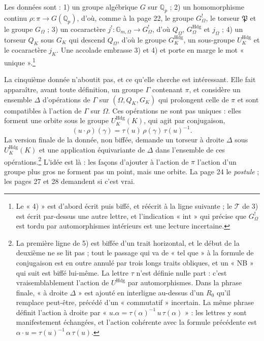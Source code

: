 \documentclass[11pt,a4paper]{article}
\begin{document}
Les données sont : 1) un groupe algébrique $G$ sur $\mathbb{Q}_p$ ; 2) un
homomorphisme continu $\rho : \pi \to G(\mathbb{Q}_p)$, d'où, comme à la
page 22, le groupe $G^{!}_{\Omega}$, le torseur $\mathfrak{P}$ et le groupe
$G_{\Omega}$ ; 3) un cocaractère $j^{!} : \mathbb{G}_{m,\Omega} \to
G^{!}_{\Omega}$, d'où $Q_{\Omega}$, $G^{\mathrm{Hdg}}_{\Omega}$ et
$j_{\Omega}$ ; 4) un torseur $Q_K$ sous $G_K$ qui descend $Q_{\Omega}$, d'où le
groupe $G^{\mathrm{Hdg}}_K$, un sous-groupe $U^{\mathrm{Hdg}}_K$ et le
cocaractère $j_K$. Une accolade embrasse 3) et 4) et porte en marge le mot
« unique ».\footnote{Le « 4) » est d'abord écrit puis biffé, et réécrit à la
ligne suivante ; le $\mathcal{T}$ de 3) est écrit par-dessus une autre
lettre, et l'indication « $\mathrm{int}$ » qui précise que $G^{!}_{\Omega}$ est
tordu par automorphismes intérieurs est une lecture incertaine.}

La cinquième donnée n'aboutit pas, et ce qu'elle cherche est intéressant. Elle
fait apparaître, avant toute définition, un groupe $\Gamma$ contenant $\pi$,
et considère un ensemble $\Delta$ d'opérations de $\Gamma$ sur
$(\Omega, Q_K, G_K)$ qui prolongent celle de $\pi$ et sont compatibles à
l'action de $\Gamma$ sur $\Omega$. Ces opérations ne sont pas uniques : elles
forment une orbite sous le groupe $U^{\mathrm{Hdg}}_K(K)$, qui agit par
conjugaison,
\[
(u \cdot \rho)(\gamma) = \tau(u)\, \rho(\gamma)\, \tau(u)^{-1}.
\]
La version finale de la donnée, non biffée, demande un torseur à droite
$\Delta$ sous $U^{\mathrm{Hdg}}_K(K)$ et une application équivariante de
$\Delta$ dans l'ensemble de ces opérations.\footnote{La première ligne de 5)
est biffée d'un trait horizontal, et le début de la deuxième ne se lit pas ;
tout le passage qui va de « tel que » à la formule de conjugaison est en outre
annulé par trois longs traits obliques, et un « NB » qui suit est biffé
lui-même. La lettre $\tau$ n'est définie nulle part : c'est vraisemblablement
l'action de $U^{\mathrm{Hdg}}$ par automorphismes. Dans la phrase finale,
« à droite $\Delta$ » est ajouté en interligne au-dessus d'un $R_0$ qu'il
remplace peut-être, précédé d'un « commutatif » incertain. La même phrase
définit l'action à droite par « $u.\alpha = \tau(\alpha)^{-1}\, u\,
\tau(\alpha)$ » : les lettres y sont manifestement échangées, et l'action
cohérente avec la formule précédente est $\alpha \cdot u =
\tau(u)^{-1}\, \alpha\, \tau(u)$.} L'idée est là : les façons d'ajouter
à l'action de $\pi$ l'action d'un groupe plus gros ne forment pas un point,
mais une orbite. La page 24 le \emph{postule} ; les pages 27 et 28
demandent si c'est vrai.
\end{document}
